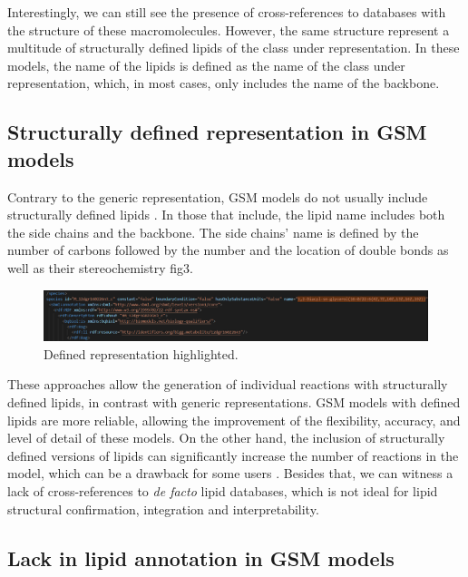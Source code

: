 \documentclass{llncs}
\begin{document}
Interestingly, we can still see the presence of cross-references to databases with the structure of these macromolecules. However, the same structure represent a multitude of structurally defined lipids of the class under representation. In these models, the name of the lipids is defined as the name of the class under representation, which, in most cases, only includes the name of the backbone.

\subsection{Structurally defined representation in GSM models}
Contrary to the generic representation, GSM models do not usually include structurally defined lipids \cite{Schutzhold}.
In those that include, the lipid name includes both the side chains and the backbone. The side chains' name is defined by the number of carbons followed by the number and the location of double bonds as well as their stereochemistry fig3.

\begin{figure}
    \includegraphics[width=\textwidth]{imagens/defenido.png}
    \caption{Defined representation highlighted.} \label{fig3}
\end{figure}

These approaches allow the generation of individual reactions with structurally defined lipids, in contrast with generic representations.
GSM models with defined lipids are more reliable, allowing the improvement of the flexibility, accuracy, and level of detail of these models. On the other hand, the inclusion of structurally defined versions of lipids can significantly increase the number of reactions in the model, which can be a drawback for some users \cite{Aung2013,Capela2022}.
Besides that, we can witness a lack of cross-references to \textit{de facto} lipid databases, which is not ideal for lipid structural confirmation, integration and interpretability.

\subsection{Lack in lipid annotation in GSM models}
 
\end{document}
